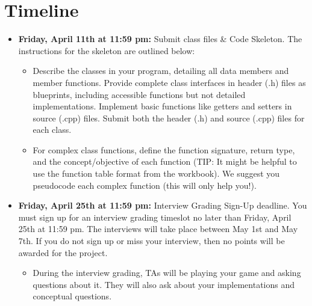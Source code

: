 \section{Timeline}

\begin{itemize}
    \item  \textbf{Friday, April 11th at 11:59 pm:} Submit class files \& Code Skeleton. The instructions for the skeleton are outlined below:
    \begin{itemize}
    \item  Describe the classes in your program, detailing all data members and member functions. Provide complete class interfaces in header (.h) files as blueprints, including accessible functions but not detailed implementations. Implement basic functions like getters and setters in source (.cpp) files. Submit both the header (.h) and source (.cpp) files for each class. 
        \item For complex class functions, define the function signature, return type, and the concept/objective of each function (TIP: It might be helpful to use the function table format from the workbook). We suggest you pseudocode each complex function (this will only help you!).
    \end{itemize}

    \item \textbf{Friday, April 25th at 11:59 pm:} Interview Grading Sign-Up deadline. You must sign up for an interview grading timeslot no later than Friday, April 25th at 11:59 pm. The interviews will take place between May 1st and May 7th. If you do not sign up or miss your interview, then no points will be awarded for the project.
    \begin{itemize}
        \item During the interview grading, TAs will be playing your game and asking questions about it. They will also ask about your implementations and conceptual questions.

    \end{itemize}


\end{itemize}

